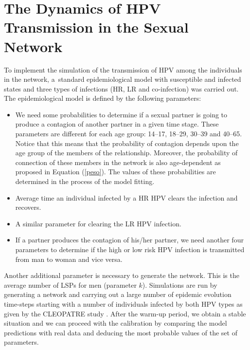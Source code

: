 \section{The Dynamics of HPV Transmission in the Sexual Network}

To implement the simulation of the transmission of HPV among the individuals in the network, a~standard epidemiological model with susceptible and infected states and three types of infections (HR, LR and co-infection) was carried out.
The epidemiological model is defined by the following parameters:

\begin{itemize}[leftmargin=*,labelsep=5mm]
\item We need some probabilities to determine if a sexual partner is going to produce a contagion of another partner in a given time stage. These parameters are different for each age group:	
 14--17, 18--29, 30--39 and 40--65. Notice that this means that the probability of contagion depends upon the age group of the members of the relationship. Moreover, the probability of connection of these members in the network is also age-dependent
as proposed in Equation (\ref{peso}). The values of these probabilities are determined in the process of the model fitting.
\item Average time an individual infected by a HR HPV clears the infection and recovers.
\item A similar parameter for clearing the LR HPV infection.
\item If a partner produces the contagion of his/her partner, we need another four parameters to determine if the high or low risk HPV infection is transmitted from man to woman and vice versa. 
\end{itemize}

Another additional parameter is necessary to generate the network. This is the average number of LSPs for men (parameter $k$). Simulations are run by generating a network and carrying out a large number of epidemic evolution time-steps starting with a number of individuals infected by both HPV types as given by the CLEOPATRE study \cite{castellsague2012prevalence}.
After the warm-up period, we obtain a stable situation and we can proceed with the calibration by comparing the model predictions with real data and deducing the most probable values of the set of parameters.

